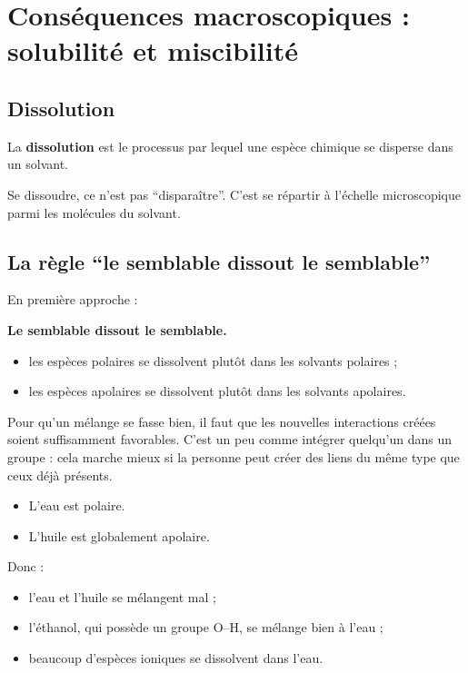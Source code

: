 \documentclass[11pt,a4paper]{article}
\begin{document}
\section{Conséquences macroscopiques : solubilité et miscibilité}

\subsection{Dissolution}

\begin{definitionbox}
La \textbf{dissolution} est le processus par lequel une espèce chimique se disperse dans un solvant.
\end{definitionbox}

\begin{comprendrebox}
Se dissoudre, ce n’est pas ``disparaître''.  
C’est se répartir à l’échelle microscopique parmi les molécules du solvant.
\end{comprendrebox}

\subsection{La règle ``le semblable dissout le semblable''}

\begin{proprietebox}
En première approche :
\begin{center}
\textbf{Le semblable dissout le semblable.}
\end{center}
\begin{itemize}
    \item les espèces polaires se dissolvent plutôt dans les solvants polaires ;
    \item les espèces apolaires se dissolvent plutôt dans les solvants apolaires.
\end{itemize}
\end{proprietebox}

\begin{analogebox}
Pour qu’un mélange se fasse bien, il faut que les nouvelles interactions créées soient suffisamment favorables.  
C’est un peu comme intégrer quelqu’un dans un groupe : cela marche mieux si la personne peut créer des liens du même type que ceux déjà présents.
\end{analogebox}

\begin{exemplebox}
\begin{itemize}
    \item L’eau est polaire.
    \item L’huile est globalement apolaire.
\end{itemize}
Donc :
\begin{itemize}
    \item l’eau et l’huile se mélangent mal ;
    \item l’éthanol, qui possède un groupe O--H, se mélange bien à l’eau ;
    \item beaucoup d’espèces ioniques se dissolvent dans l’eau.
\end{itemize}
\end{exemplebox}
\end{document}
